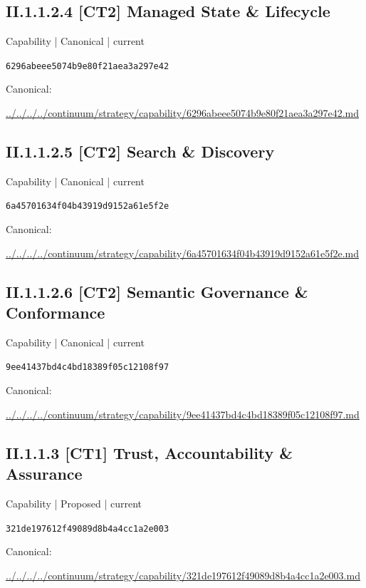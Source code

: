 \documentclass[10pt,a4paper]{article}
\begin{document}
\subsection*{II.1.1.2.4 [CT2] Managed State \& Lifecycle}
{\small Capability | Canonical | current}\par
\texttt{6296abeee5074b9e80f21aea3a297e42}\par
Canonical: \par
{\footnotesize\url{../../../../continuum/strategy/capability/6296abeee5074b9e80f21aea3a297e42.md}}\par
\subsection*{II.1.1.2.5 [CT2] Search \& Discovery}
{\small Capability | Canonical | current}\par
\texttt{6a45701634f04b43919d9152a61e5f2e}\par
Canonical: \par
{\footnotesize\url{../../../../continuum/strategy/capability/6a45701634f04b43919d9152a61e5f2e.md}}\par
\subsection*{II.1.1.2.6 [CT2] Semantic Governance \& Conformance}
{\small Capability | Canonical | current}\par
\texttt{9ee41437bd4c4bd18389f05c12108f97}\par
Canonical: \par
{\footnotesize\url{../../../../continuum/strategy/capability/9ee41437bd4c4bd18389f05c12108f97.md}}\par
\subsection*{II.1.1.3 [CT1] Trust, Accountability \& Assurance}
{\small Capability | Proposed | current}\par
\texttt{321de197612f49089d8b4a4cc1a2e003}\par
Canonical: \par
{\footnotesize\url{../../../../continuum/strategy/capability/321de197612f49089d8b4a4cc1a2e003.md}}\par
\end{document}
